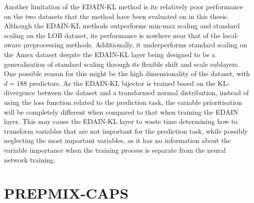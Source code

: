 \documentclass{statsmsc}
\begin{document}
{Another limitation of the \ac{EDAIN-KL} method is its relatively poor performance on the two
datasets that the method have been evaluated on in this thesis. Although the
\ac{EDAIN-KL} methods outperforms min-max scaling and standard scaling on the
\ac{LOB} dataset, its performance is nowhere near that of the local-aware preprocessing
methods. Additionally, it underperforms standard scaling on the Amex dataset despite
the \ac{EDAIN-KL} layer being designed to be a generalisation of standard scaling through
its flexible shift and scale sublayers. One possible reason for this might be the high
dimensionality of the dataset, with $d=188$ predictors. As the \ac{EDAIN-KL} bijector is trained
based on the \ac{KL-divergence} between the dataset and a transformed normal distribution, instead
of using the loss function related to the prediction task, the variable prioritisation will be
completely different when compared to that when training the \ac{EDAIN} layer. This may cause
the \ac{EDAIN-KL} layer to waste time determining how to transform variables that are not
important for the prediction task, while possibly neglecting the most important variables,
as it has no information about the variable importance when the training process is separate
from the neural network training.



\section{PREPMIX-CAPS}%
\label{sec:PREPMIX-CAPS}


}
\end{document}
